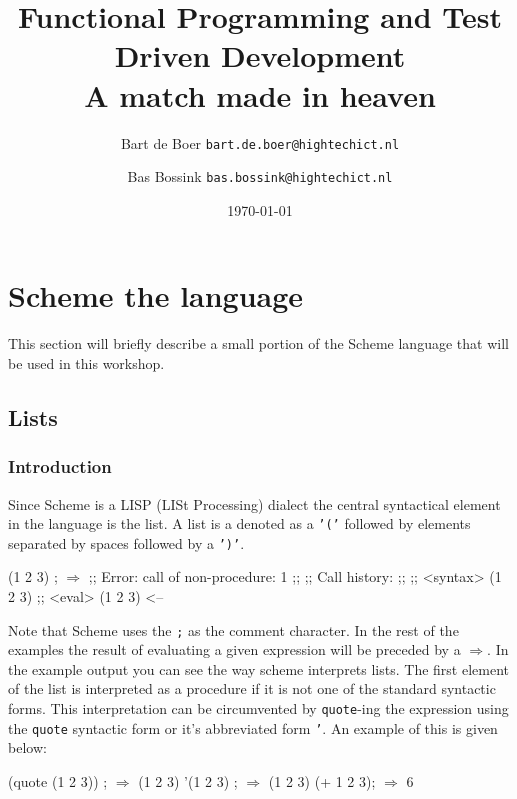 \documentclass[12pt,a4paper,english,twoside]{article}
\author{
    Bart de Boer \texttt{bart.de.boer@hightechict.nl}
    \and
    Bas Bossink \texttt{bas.bossink@hightechict.nl}
}
\date{\today}
\title{Functional Programming and Test Driven Development\\
\vspace{2 mm} {\large A match made in heaven}}
\begin{document}
\maketitle
\section{Scheme the language}
This section will briefly describe a small portion of the Scheme language that will be used in this workshop.
\subsection{Lists}
\subsubsection{Introduction}
Since Scheme is a LISP (LISt Processing) dialect the central syntactical element in the language is the list. A list is a denoted as a \texttt{'('} followed by elements separated by spaces followed by a \texttt{')'}.
\begin{schemecode}
(1 2 3) ; $\Rightarrow$ 
;;	Error: call of non-procedure: 1
;;
;;	Call history:
;;
;;	<syntax>	  (1 2 3)
;;	<eval>	  (1 2 3)	<--

\end{schemecode}
Note that Scheme uses the \texttt{;} as the comment character. In the rest of the examples the result of evaluating a given expression will be preceded by a $\Rightarrow$. In the example output you can see the way scheme interprets lists. The first element of the list is interpreted as a procedure if it is not one of the standard syntactic forms. This interpretation can be circumvented by \texttt{quote}-ing the expression using the \texttt{quote} syntactic form or it's abbreviated form \texttt{'}. An example of this is given below:
\begin{schemecode}
(quote (1 2 3)) ; $\Rightarrow$ (1 2 3)
'(1 2 3) ; $\Rightarrow$ (1 2 3)
(+ 1 2 3); $\Rightarrow$ 6
\end{schemecode}
\end{document}

